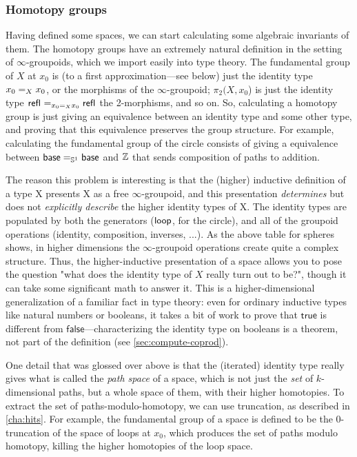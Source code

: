 \subsubsection{Homotopy groups}  Having defined some spaces, we can start
  calculating some algebraic invariants of them.  The homotopy groups
  have an extremely natural definition in the setting of
  $\infty$-groupoids, which we import easily into type theory.  The fundamental group of $X$ at $x_0$
  is (to a first approximation---see below) just the identity type
  $\id[X] {x_0} {x_0}$, or the morphisms of the $\infty$-groupoid;
  $\pi_2(X,x_0$) is just the identity type $\id[{\id[X] {x_0} {x_0}}]
  {\refl{}}{\refl{}}$ the 2-morphisms, and so on.  So, calculating a
  homotopy group is just giving an equivalence between an identity type
  and some other type, and proving that this equivalence preserves the
  group structure.  For example, calculating the fundamental group of
  the circle consists of giving a equivalence between $\id[{\Sn ^1}]
  \base \base$ and $\Z$ that sends composition of paths to
  addition.

The reason this problem is interesting is that the (higher) inductive
definition of a type X presents X as a free $\infty$-groupoid, and this
presentation \emph{determines} but does not \emph{explicitly describe}
the higher identity types of X.  The identity types are populated by
both the generators ($\lloop$, for the circle), and all of the groupoid
operations (identity, composition, inverses, ...).  As the above table
for spheres shows, in higher dimensions the $\infty$-groupoid operations
create quite a complex structure.  Thus, the higher-inductive
presentation of a space allows you to pose the question "what does the
identity type of $X$ really turn out to be?", though it can take some
significant math to answer it.  This is a higher-dimensional
generalization of a familiar fact in type theory: even for ordinary
inductive types like natural numbers or booleans, it takes a bit of work
to prove that $\mathsf{true}$ is different from $\mathsf{false}$---characterizing the
identity type on booleans is a theorem, not part of the definition
(see \autoref{sec:compute-coprod}).

One detail that was glossed over above is that the (iterated) identity
type really gives what is called the \emph{path space} of a space, which
is not just the \emph{set} of $k$-dimensional paths, but a whole space
of them, with their higher homotopies.  To extract the set of
paths-modulo-homotopy, we can use truncation, as described in
\autoref{cha:hits}.  For example, the fundamental group of a
space is defined to be the 0-truncation of the space of loops at $x_0$,
which produces the set of paths modulo homotopy, killing the higher
homotopies of the loop space.

